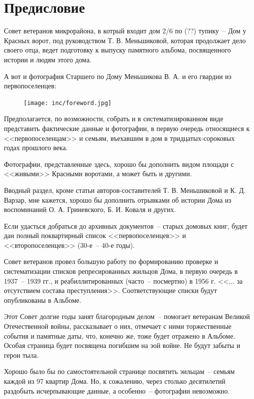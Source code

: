 \chapter{Предисловие}

Совет ветеранов микрорайона, в котрый входит дом 2/6 по (??) тупику~-- Дом у Красных ворот, под руководством Т. В. Меньшиковой, которая продолжает дело своего отца, ведет подготовку к выпуску памятного альбома, посвященного истории и людям этого дома.

А вот и фотография Старшего по Дому Меньшикова В. А. и его гвардии из первопоселенцев:

\begin{figure}[ht]
  \centering
  \texttt{[image: inc/foreword.jpg]}
\end{figure}

Предполагается, по возможности, собрать и в систематизированном виде представить фактические данные и фотографии, в первую очередь относящиеся к <<первопоселенцам>> и семьям, въехавшим в дом в тридцатых-сороковых годах прошлого века.

Фотографии, представленные здесь, хорошо бы дополнить видом площади с <<живыми>> Красными воротами, а может быть и другими.

Вводный раздел, кроме статьи авторов-составителей Т. В. Меньшиковой и К. Д. Варзар, мне кажется, хорошо бы дополнить отрывками об истории Дома из воспоминаний О. А. Гриневского, Б. И. Коваля и других.

Если удасться добраться до архивных документов~-- старых домовых книг, будет дан полный поквартирный список <<первопоселенцев>> и <<второпоселенцев>> (30-е~-- 40-е годы).

Совет ветеранов провел большую работу по формированию проверке и систематизации списков репресированных жильцов Дома, в первую очередь в 1937~-- 1939 гг., и реабиллитированных (часто~-- посмертно) в 1956 г. <<... за отсутствием состава преступления>>. Соответствующие списки будут опубликованы в Альбоме.

Этот Совет долгие годы занят благородным делом~-- помогает ветеранам Великой Отечественной войны, рассказывает о них, отмечает с ними торжественные события и памятные даты, что, конечно же, тоже будет отражено в Альбоме. Особая страница будет посвящена погибшим на эой войне. Не будут забыты и герои тыла.

Хорошо было бы по самостоятельной странице посвятить эильцам~-- семьям каждой из 97 квартир Дома. Но, к сожалению, через столько десятилетий раздобыть исчерпывающие данные, а особенно~-- фотографии невозможно.


